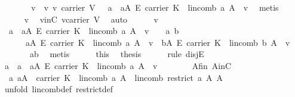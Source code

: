 \begin{isabellebody}
\ \ \ \ \isamarkupfalse%
\ \isamarkupfalse%
\ v\ \ v{\isacharcolon}\ {\isachardoublequoteopen}v{\isasymin}\ carrier\ V\ {\isasymand}\ {\isasymnot}{\isacharparenleft}{\isasymexists}{\isacharbang}\ a{\isachardot}\ \ a{\isasymin}A\ {\isasymrightarrow}\isactrlsub E\ carrier\ K\ {\isasymand}\ lincomb\ a\ A\ {\isacharequal}\ v{\isacharparenright}{\isachardoublequoteclose}\ \isamarkupfalse%
\ metis\isanewline
\ \ \ \ \isanewline
\ \ \ \ \isamarkupfalse%
\ v\ \isamarkupfalse%
\ vinC{\isacharcolon}\ {\isachardoublequoteopen}v{\isasymin}carrier\ V{\isachardoublequoteclose}\ \isamarkupfalse%
\ auto\isanewline
\ \ \ \ \isamarkupfalse%
\ v\ \isamarkupfalse%
\ {\isachardoublequoteopen}{\isasymnot}{\isacharparenleft}{\isasymexists}\ a{\isachardot}\ \ a{\isasymin}A\ {\isasymrightarrow}\isactrlsub E\ carrier\ K\ {\isasymand}\ lincomb\ a\ A\ {\isacharequal}\ v{\isacharparenright}\ {\isasymor}\ \ {\isacharparenleft}{\isasymexists}\ a\ b{\isachardot}\ \isanewline
\ \ \ \ \ \ a{\isasymin}A\ {\isasymrightarrow}\isactrlsub E\ carrier\ K\ {\isasymand}\ lincomb\ a\ A\ {\isacharequal}\ v\ {\isasymand}\ b{\isasymin}A\ {\isasymrightarrow}\isactrlsub E\ carrier\ K\ {\isasymand}\ lincomb\ b\ A\ {\isacharequal}\ v\ \isanewline
\ \ \ \ \ \ {\isasymand}\ a{\isasymnoteq}b{\isacharparenright}{\isachardoublequoteclose}\ \isamarkupfalse%
\ metis\isanewline
\ \ \ \ \isamarkupfalse%
\ this\ \isamarkupfalse%
\ {\isacharquery}thesis\isanewline
\ \ \ \ \isamarkupfalse%
\ {\isacharparenleft}rule\ disjE{\isacharparenright}\isanewline
\ \ \ \ \ \ \isamarkupfalse%
\ a{\isacharcolon}\ {\isachardoublequoteopen}{\isasymnot}{\isacharparenleft}{\isasymexists}\ a{\isachardot}\ \ a{\isasymin}A\ {\isasymrightarrow}\isactrlsub E\ carrier\ K\ {\isasymand}\ lincomb\ a\ A\ {\isacharequal}\ v{\isacharparenright}{\isachardoublequoteclose}\isanewline
\ \ \ \ \ \ \isamarkupfalse%
\ A{\isacharunderscore}fin\ AinC\ \isamarkupfalse%
\ {}{\isacharcolon}\ {\isachardoublequoteopen}{\isasymAnd}a{\isachardot}\ a{\isasymin}A\ {\isasymrightarrow}\ carrier\ K\ {\isasymLongrightarrow}\ lincomb\ a\ A\ {\isacharequal}\ lincomb\ {\isacharparenleft}restrict\ a\ A{\isacharparenright}\ A{\isachardoublequoteclose}\ \isanewline
\ \ \ \ \ \ \ \ \isamarkupfalse%
\ {\isacharparenleft}unfold\ lincomb{\isacharunderscore}def\ restrict{\isacharunderscore}def{\isacharparenright}\isanewline

\end{isabellebody}
